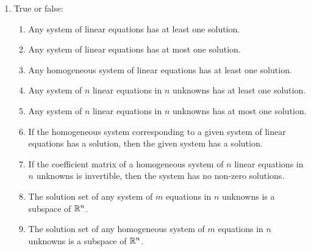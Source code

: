 \documentclass[../psets.tex]{subfiles}
\begin{document}
\begin{enumerate}[label={\textbf{6.\arabic*.}}]
    \item True or false:
    \begin{enumerate}
        \item Any system of linear equations has at least one solution.
        \item Any system of linear equations has at most one solution.
        \item Any homogeneous system of linear equations has at least one solution.
        \item Any system of $n$ linear equations in $n$ unknowns has at least one solution.
        \item Any system of $n$ linear equations in $n$ unknowns has at most one solution.
        \item If the homogeneous system corresponding to a given system of linear equations has a solution, then the given system has a solution.
        \item If the coefficient matrix of a homogeneous system of $n$ linear equations in $n$ unknowns is invertible, then the system has no non-zero solutions.
        \item The solution set of any system of $m$ equations in $n$ unknowns is a subspace of $\mathbb{R}^n$.
        \item The solution set of any homogeneous system of $m$ equations in $n$ unknowns is a subspace of $\mathbb{R}^n$.
    \end{enumerate}
\end{enumerate}
\end{document}
